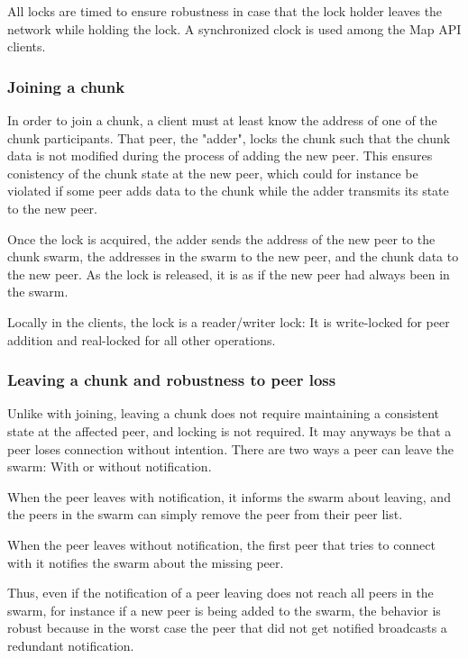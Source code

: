 \documentclass{article}
\begin{document}
All locks are timed to ensure robustness in case that the lock holder leaves
the network while holding the lock. A synchronized clock is used among the
Map API clients.

\subsubsection{Joining a chunk}

In order to join a chunk, a client must at least know the address of one of the
chunk participants. That peer, the "adder", locks the chunk such that the chunk
data is not modified during the process of adding the new peer. This ensures
conistency of the chunk state at the new peer, which could for instance be
violated if some peer adds data to the chunk while the adder transmits its state
to the new peer.

Once the lock is acquired, the adder sends the address of the new peer to the
chunk swarm, the addresses in the swarm to the new peer, and the chunk data to
the new peer. As the lock is released, it is as if the new peer had always been
in the swarm.

Locally in the clients, the lock is a reader/writer lock: It is write-locked
for peer addition and real-locked for all other operations.

\subsubsection{Leaving a chunk and robustness to peer loss}

Unlike with joining, leaving a chunk does not require maintaining a consistent
state at the affected peer, and locking is not required. It may anyways be that
a peer loses connection without intention. There are two ways a peer can leave
the swarm: With or without notification.

When the peer leaves with notification, it informs the swarm about leaving, and
the peers in the swarm can simply remove the peer from their peer list.

When the peer leaves without notification, the first peer that tries to connect
with it notifies the swarm about the missing peer.

Thus, even if the notification of a peer leaving does not reach all peers in the
swarm, for instance if a new peer is being added to the swarm, the behavior
is robust because in the worst case the peer that did not get notified
broadcasts a redundant notification.
\end{document}
